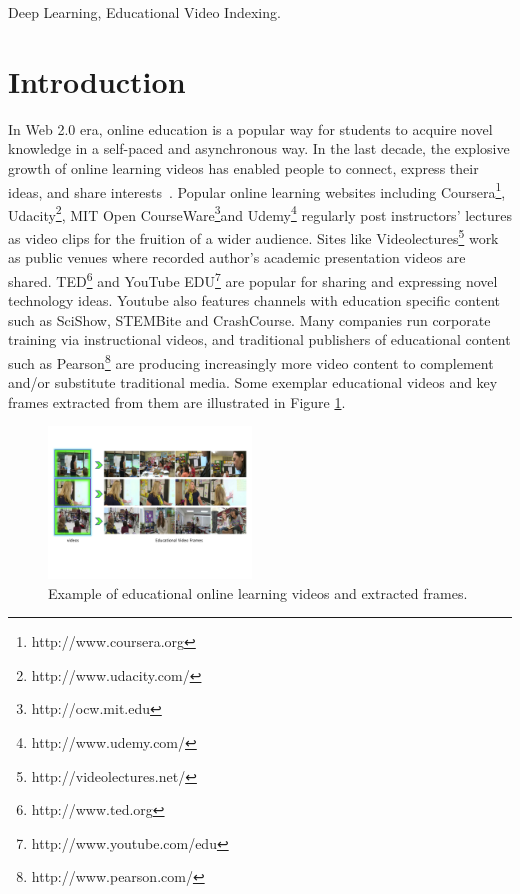 \documentclass[11pt,twocolumn,twoside]{IEEEtran}
\begin{document}
\begin{IEEEkeywords}
Deep Learning, Educational Video Indexing.
\end{IEEEkeywords}


\section{Introduction}
In Web 2.0 era, online education is a popular way for students to
acquire novel knowledge in a self-paced and asynchronous way. In the last decade, the explosive growth of online learning videos has enabled people to connect, express their ideas, and share interests~\cite{survey}. Popular online
learning websites including
Coursera\footnote[1]{http://www.coursera.org},
Udacity\footnote[2]{http://www.udacity.com/},
MIT Open CourseWare\footnote[3]{http://ocw.mit.edu}and
Udemy\footnote[4]{http://www.udemy.com/}
regularly post instructors' lectures as video clips for the fruition of a wider  audience. Sites like Videolectures\footnote[5]{http://videolectures.net/} work as public venues where recorded author's academic presentation videos are shared. TED\footnote[6]{http://www.ted.org} and YouTube EDU\footnote[7]{http://www.youtube.com/edu} are popular for sharing and expressing
novel technology ideas. Youtube also features channels with education specific content such as SciShow, STEMBite and CrashCourse. Many companies run corporate training via instructional videos, and traditional publishers of educational content such as Pearson\footnote[8]{http://www.pearson.com/} are producing increasingly more video content to complement and/or substitute traditional media. Some exemplar educational videos and key frames extracted from them are illustrated in Figure \ref{fig:fig1}.

\begin{figure}
\includegraphics[width=0.48\textwidth]{fig1.pdf}
\caption{Example of educational online learning videos and extracted frames.%
}
 \label{fig:fig1}
\end{figure}
\end{document}
